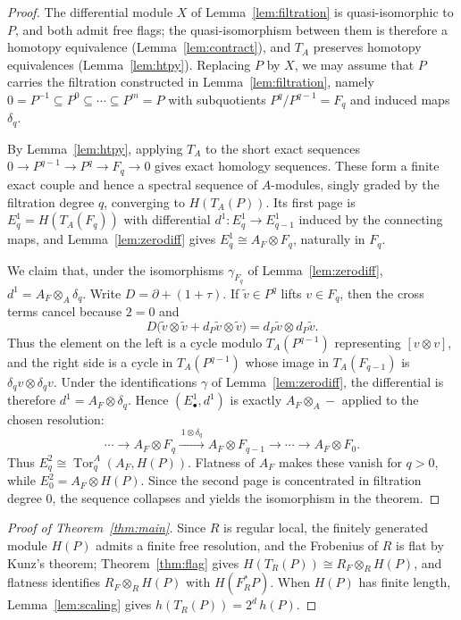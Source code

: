\documentclass[11pt,reqno]{amsart}
\theoremstyle{plain}
\theoremstyle{definition}
\DeclareMathOperator{\Tor}{Tor}
\newcommand{\Tate}{T}                 %
\newcommand{\Frob}{F_R^{*}}           %
\newcommand{\Rone}{R_F}               %
\newcommand{\htot}{h}
\begin{document}
\begin{proof}
The differential module $X$ of Lemma~\ref{lem:filtration} is quasi-isomorphic to $P$, and both admit free
flags; the quasi-isomorphism between them is therefore a homotopy equivalence
(Lemma~\ref{lem:contract}), and $\Tate_A$ preserves homotopy equivalences
(Lemma~\ref{lem:htpy}).  Replacing $P$ by $X$, we may assume that $P$ carries the filtration
constructed in Lemma~\ref{lem:filtration}, namely
$0=P^{-1}\subseteq P^{0}\subseteq\cdots\subseteq P^{m}=P$ with subquotients
$P^{q}/P^{q-1}=F_{q}$ and induced maps $\delta_{q}$.

By Lemma~\ref{lem:htpy}, applying
$\Tate_A$ to the short exact sequences $0\to P^{q-1}\to P^{q}\to F_{q}\to0$ gives exact homology
sequences.  These form a finite exact couple and hence a spectral sequence of $A$-modules, singly
graded by the filtration degree $q$, converging to $H(\Tate_A(P))$.  Its first page is
$E^1_{q}=H(\Tate_A(F_{q}))$ with differential
$d^1\colon E^1_{q}\to E^1_{q-1}$ induced by the connecting maps, and Lemma~\ref{lem:zerodiff} gives
$E^1_{q}\cong A_F\otimes F_q$, naturally in $F_{q}$.

We claim that, under the isomorphisms $\gamma_{F_q}$ of Lemma~\ref{lem:zerodiff},
$d^1=A_F\otimes_A\delta_q$.  Write $D=\partial+(1+\tau)$.  If
$\tilde v\in P^{q}$ lifts $v\in F_q$, then the cross terms cancel because $2=0$ and
\[
D\bigl(\tilde v\otimes\tilde v+d_P\tilde v\otimes\tilde v\bigr)
 =d_P\tilde v\otimes d_P\tilde v.
\]
Thus the element on the left is a cycle modulo $\Tate_A(P^{q-1})$ representing
$[v\otimes v]$, and the right side is a cycle in $\Tate_A(P^{q-1})$ whose image in
$\Tate_A(F_{q-1})$ is $\delta_qv\otimes\delta_qv$.  Under the identifications $\gamma$ of
Lemma~\ref{lem:zerodiff}, the differential is therefore $d^1=A_F\otimes\delta_q$.  Hence
$(E^1_{\bullet},d^1)$ is exactly $A_F\otimes_A-$ applied to the chosen resolution:
\[
\cdots\longrightarrow A_F\otimes F_q\xrightarrow{\ 1\otimes\delta_q\ }A_F\otimes F_{q-1}
\longrightarrow\cdots\longrightarrow A_F\otimes F_0.
\]
Thus $E^2_{q}\cong\Tor^A_q(A_F,H(P))$.  Flatness of $A_F$ makes these vanish for $q>0$,
while $E^2_{0}=A_F\otimes H(P)$.  Since the second page is concentrated in filtration degree $0$,
the sequence collapses and yields the isomorphism in the theorem.
\end{proof}

\begin{proof}[Proof of Theorem~\ref{thm:main}]
Since $R$ is regular local, the finitely generated module $H(P)$ admits a finite free resolution,
and the Frobenius of $R$ is flat by Kunz's theorem; Theorem~\ref{thm:flag} gives
$H(\Tate_R(P))\cong\Rone\otimes_RH(P)$, and flatness identifies $\Rone\otimes_RH(P)$ with
$H(\Frob P)$.  When $H(P)$ has finite length, Lemma~\ref{lem:scaling} gives
$\htot(\Tate_R(P))=2^{d}\,\htot(P)$.
\end{proof}
\end{document}

